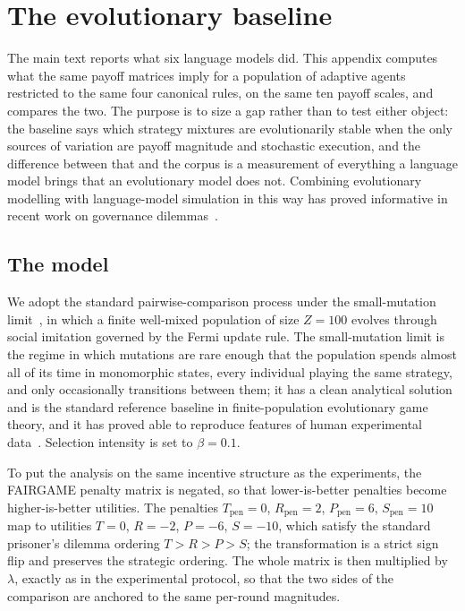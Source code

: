 \documentclass[openacc]{rsproca_new}
\newcommand{\lam}{\lambda}
\begin{document}
\section{The evolutionary baseline}\label{appendix:egt}

The main text reports what six language models did. This appendix computes what
the same payoff matrices imply for a population of adaptive agents restricted
to the same four canonical rules, on the same ten payoff scales, and compares
the two. The purpose is to size a gap rather than to test either object:
the baseline says which strategy mixtures are evolutionarily stable when the
only sources of variation are payoff magnitude and stochastic execution, and
the difference between that and the corpus is a measurement of everything a
language model brings that an evolutionary model does not. Combining
evolutionary modelling with language-model simulation in this way has proved
informative in recent work on governance
dilemmas~\cite{balabanova2025media,buscemi2025llms}.

\subsection{The model}\label{appendix:egt_model}

We adopt the standard pairwise-comparison process under the small-mutation
limit~\cite{sigmund:2010bo,han_when_2021,nowak2004emergence,liu2020evolutionary},
in which a finite well-mixed population of size $Z = 100$ evolves through
social imitation governed by the Fermi update rule. The small-mutation limit is
the regime in which mutations are rare enough that the population spends almost
all of its time in monomorphic states, every individual playing the same
strategy, and only occasionally transitions between them; it has a clean
analytical solution and is the standard reference baseline in finite-population
evolutionary game theory, and it has proved able to reproduce features of human
experimental data~\cite{rand2013evolution,zisis2015generosity}. Selection
intensity is set to $\beta = 0.1$.

To put the analysis on the same incentive structure as the experiments, the
FAIRGAME penalty matrix is negated, so that lower-is-better penalties become
higher-is-better utilities. The penalties $T_{\text{pen}} = 0$,
$R_{\text{pen}} = 2$, $P_{\text{pen}} = 6$, $S_{\text{pen}} = 10$ map to
utilities $T = 0$, $R = -2$, $P = -6$, $S = -10$, which satisfy the standard
prisoner's dilemma ordering $T > R > P > S$; the transformation is a strict
sign flip and preserves the strategic ordering. The whole matrix is then
multiplied by $\lam$, exactly as in the experimental protocol, so that the two
sides of the comparison are anchored to the same per-round magnitudes.
\end{document}
